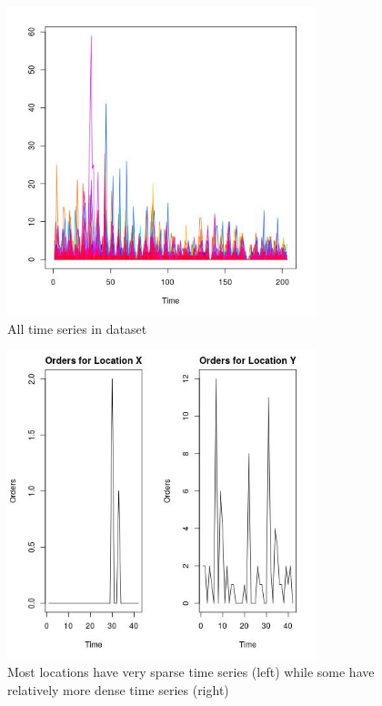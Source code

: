 \documentclass[12pt, letterpaper] {article}
\begin{document}
\begin{figure}[H]
    \centering
    \includegraphics[width=0.8\textwidth, height=0.5\textheight]{Images/example_all_ts.jpg}
    \caption{All time series in dataset}
    \label{fig:All time series in dataset}
\end{figure}


\begin{figure}[H]
    \centering
    \includegraphics[width=0.8\textwidth, height=0.4\textheight] {Images/example_ts.jpg}
    \caption{Most locations have very sparse time series (left) while some have relatively more dense time series (right)}
    \label{fig:Most locations have very sparse time series (left) while some have relatively more dense time series (right)}
\end{figure}
\end{document}
